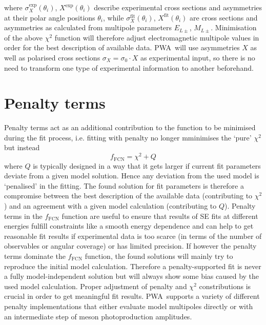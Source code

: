 \documentclass[a4paper,10pt]{article}
\def\PWA{\ttfamily PWA\rmfamily\ }
\begin{document}
where $\sigma_X^\mathrm{exp}(\theta_i)$, $X^\mathrm{exp}(\theta_i)$ describe experimental cross sections and asymmetries
at their polar angle positions $\theta_i$, while 
$\sigma_X^\mathrm{fit}(\theta_i)$, $X^\mathrm{fit}(\theta_i)$ are cross sections and asymmetries as calculated from
multipole parameters $E_{L\pm}$, $M_{L\pm}$.
Minimisation of the above $\chi^2$ function will therefore adjust electromagnetic multipole values in order for the best description
of available data.
\PWA will use asymmetries $X$ as well as polarised cross sections $\sigma_X = \sigma_0\cdot X$ as experimental input,
so there is no need to transform one type of experimental information to another beforehand.

\section{Penalty terms}

Penalty terms act as an additional contribution to the function to be minimised during the fit process, i.e. fitting with penalty
no longer mminimises the `pure' $\chi^2$ but instead
\begin{displaymath}
 f_\mathrm{FCN} = \chi^2 + Q
\end{displaymath}
where $Q$ is typically designed in a way that it gets larger if current fit parameters deviate from a given
model solution. Hence any deviation from the used model is `penalised' in the fitting. The found solution
for fit parameters is therefore a compromise between the best description of the available data (contributing to $\chi^2$)
and an agreement with a given model calculation (contributing to $Q$).
Penalty terms in the $f_\mathrm{FCN}$ function are useful to ensure that results of SE fits at different energies
fulfill constraints like a smooth energy dependence and can help to get reasonable fit results
if experimental data is too scarce (in terms of the number of observables or angular coverage) or has limited precision.
If however the penalty terms dominate the $f_\mathrm{FCN}$
function, the found solutions will mainly try to reproduce the initial model calculation. Therefore a penalty-supported fit 
is never a fully model-independent solution but will always show some bias caused by the used model calculation.
Proper adjustment of penalty and $\chi^2$ constributions is crucial in order to get meaningful fit results.
\PWA supports a variety of different penalty implementations that either evaluate model multipoles directly or with
an intermediate step of meson photoproduction amplitudes.
\end{document}
